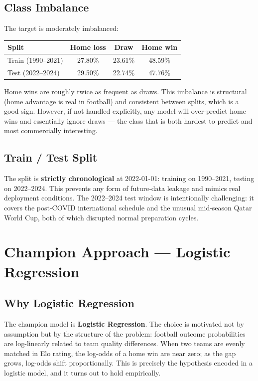 \documentclass[12pt,a4paper,openany]{report}
\begin{document}
\section{Class Imbalance}

The target is moderately imbalanced:

\begin{center}
\begin{tabular}{lccc}
  \toprule
  \textbf{Split} & \textbf{Home loss} & \textbf{Draw} & \textbf{Home win} \\
  \midrule
  Train (1990--2021) & 27.80\% & 23.61\% & 48.59\% \\
  Test (2022--2024)  & 29.50\% & 22.74\% & 47.76\% \\
  \bottomrule
\end{tabular}
\end{center}

\medskip
Home wins are roughly twice as frequent as draws. This imbalance is structural
(home advantage is real in football) and consistent between splits, which is
a good sign. However, if not handled explicitly, any model will over-predict
home wins and essentially ignore draws --- the class that is both hardest to
predict and most commercially interesting.

\section{Train / Test Split}

The split is \textbf{strictly chronological} at 2022-01-01: training on 1990--2021,
testing on 2022--2024. This prevents any form of future-data leakage and mimics
real deployment conditions. The 2022--2024 test window is intentionally
challenging: it covers the post-COVID international schedule and the unusual
mid-season Qatar World Cup, both of which disrupted normal preparation cycles.

\chapter{Champion Approach --- Logistic Regression}

\section{Why Logistic Regression}

The champion model is \textbf{Logistic Regression}. The choice is motivated not by
assumption but by the structure of the problem: football outcome probabilities
are log-linearly related to team quality differences. When two teams are
evenly matched in Elo rating, the log-odds of a home win are near zero; as the
gap grows, log-odds shift proportionally. This is precisely the hypothesis
encoded in a logistic model, and it turns out to hold empirically.
\end{document}
